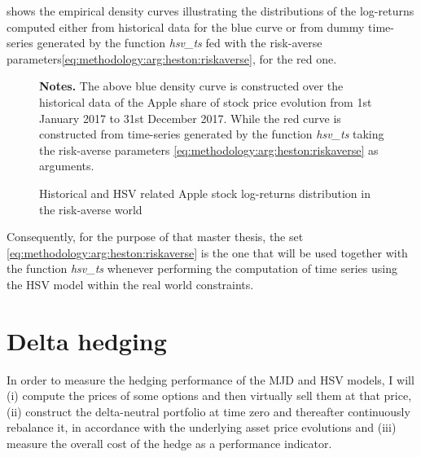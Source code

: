 \documentclass[12pt,a4paper]{report}
\begin{document}
 shows the empirical density curves illustrating the distributions of the log-returns computed either from historical data for the blue curve or from dummy time-series generated by the function \textit{hsv\_ts} fed with the risk-averse parameters\ref{eq:methodology:arg:heston:riskaverse}, for the red one.


\begin{figure}[h]
  \centering
  
  \caption{Historical and HSV related Apple stock log-returns distribution in the risk-averse world}
  \begin{changemargin}{0.5cm}{0.5cm}
  \medskip
\footnotesize
{}\textbf{Notes.} The above blue density curve is constructed over the historical data of the Apple share of stock price evolution from 1st January 2017 to 31st December 2017. While the red curve is constructed from time-series generated by the function \textit{hsv\_ts} taking the risk-averse parameters \ref{eq:methodology:arg:heston:riskaverse} as arguments.  
\end{changemargin}
  \label{p:methodology:density:aapl:heston:riskaverse}
\end{figure}

Consequently, for the purpose of that master thesis, the set \ref{eq:methodology:arg:heston:riskaverse} is the one that will be used together with the function \textit{hsv\_ts} whenever performing the computation of time series using the HSV model within the real world constraints.



\section{Delta hedging}
\label{sec:methodology:delta}

In order to measure the hedging performance of the MJD and HSV models, I will (i) compute the prices of some options and then virtually sell them at that price, (ii)  construct the delta-neutral portfolio at time zero and thereafter continuously rebalance it, in accordance with the underlying asset price evolutions and (iii) measure the overall cost of the hedge as a performance indicator.
\end{document}
